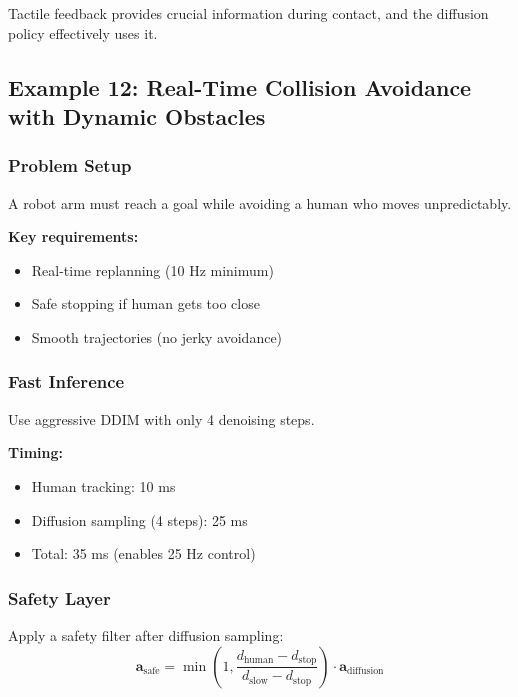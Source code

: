 Tactile feedback provides crucial information during contact, and the diffusion policy effectively uses it.

\subsection{Example 12: Real-Time Collision Avoidance with Dynamic Obstacles}
\label{subsec:example_dynamic_obstacles}

\subsubsection{Problem Setup}

A robot arm must reach a goal while avoiding a human who moves unpredictably.

\textbf{Key requirements:}
\begin{itemize}
    \item Real-time replanning (10 Hz minimum)
    \item Safe stopping if human gets too close
    \item Smooth trajectories (no jerky avoidance)
\end{itemize}

\subsubsection{Fast Inference}

Use aggressive DDIM with only 4 denoising steps.

\textbf{Timing:}
\begin{itemize}
    \item Human tracking: 10 ms
    \item Diffusion sampling (4 steps): 25 ms
    \item Total: 35 ms (enables 25 Hz control)
\end{itemize}

\subsubsection{Safety Layer}

Apply a safety filter after diffusion sampling:
\begin{equation}
\mathbf{a}_{\text{safe}} = \min\left(1, \frac{d_{\text{human}} - d_{\text{stop}}}{d_{\text{slow}} - d_{\text{stop}}}\right) \cdot \mathbf{a}_{\text{diffusion}}
\label{eq:safety_filter}
\end{equation}

